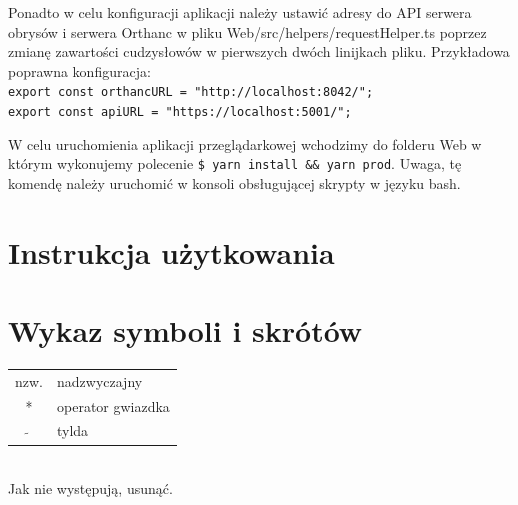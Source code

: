\documentclass[a4paper,11pt,twoside]{report}
\theoremstyle{definition}
\begin{document}
Ponadto w celu konfiguracji aplikacji należy ustawić adresy do API serwera obrysów i serwera Orthanc w pliku Web/src/helpers/requestHelper.ts poprzez zmianę zawartości cudzysłowów w pierwszych dwóch linijkach pliku. 	Przykładowa poprawna konfiguracja:\\
\texttt{export const orthancURL = "http://localhost:8042/";}\\
\texttt{export const apiURL = "https://localhost:5001/";}

W celu uruchomienia aplikacji przeglądarkowej wchodzimy do folderu Web w którym wykonujemy polecenie \texttt{\$ yarn install \&\& yarn prod}. Uwaga, tę komendę należy uruchomić w konsoli obsługującej skrypty w języku bash.




\chapter*{Instrukcja użytkowania}



\chapter*{Wykaz symboli i skrótów}


\begin{tabular}{cl}
nzw. & nadzwyczajny \\
* & operator gwiazdka \\
$\widetilde{}$ & tylda
\end{tabular}
\\
Jak nie występują, usunąć.







\end{document}
